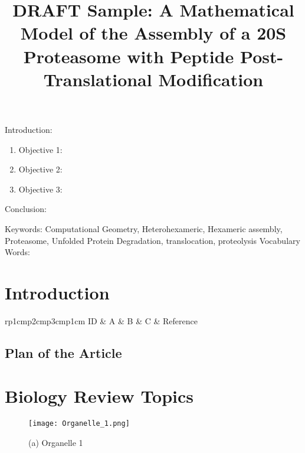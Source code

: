 

\twocolumn
\scriptsize
\begin{frontmatter}
		\title{DRAFT Sample: A Mathematical Model of the Assembly of a 20S Proteasome with Peptide Post-Translational Modification}
		\author{}
		\address{The Mathematical Learning Space}
\end{frontmatter}	

Introduction:
\begin{enumerate}
\item Objective 1:
\item Objective 2:
\item Objective 3:
\end{enumerate}
Conclusion:

Keywords: Computational Geometry, Heterohexameric, Hexameric assembly, Proteasome, Unfolded Protein Degradation, translocation, proteolysis
Vocabulary Words:

\section{Introduction}

\centering
\begin{table}[H]\footnotesize
	\caption{}
	\begin{tabular}{rp{1cm}p{2cm}p{3cm}p{1cm}}
		\hline
		ID & A & B & C & Reference \\
		\hline
		\hline
	\end{tabular}
\end{table}
\raggedright


\subsection{Plan of the Article}

\begin{enumerate}
\end{enumerate}

\section{Biology Review Topics}

\begin{figure}[H]
\begin{minipage}[b]{0.3\linewidth}
\texttt{[image: Organelle\_1.png]} 
\end{minipage}\hfill
\caption{(a) Organelle 1 }
\label{fig:Figure2}
\end{figure} 


